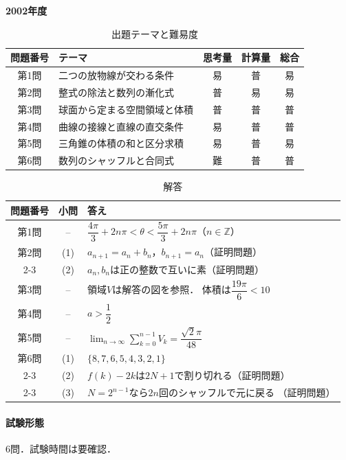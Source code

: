 \documentclass[../../main.tex]{subfiles}
\begin{document}
\begin{center}
  {\fontsize{48pt}{58pt}\selectfont \textbf{2002}\normalsize\textbf{年度}}
\end{center}

\begin{table}[htb]
  \centering
  \caption{出題テーマと難易度}
  \begin{tabular}{|c|p{6.2cm}|c|c|c|}
    \hline
    \textbf{問題番号} & \textbf{テーマ} & \textbf{思考量} & \textbf{計算量} & \textbf{総合} \\
    \hline
    第1問 & 二つの放物線が交わる条件 & 易 & 普 & 易 \\
    \hline
    第2問 & 整式の除法と数列の漸化式 & 普 & 易 & 易 \\
    \hline
    第3問 & 球面から定まる空間領域と体積 & 普 & 普 & 普 \\
    \hline
    第4問 & 曲線の接線と直線の直交条件 & 易 & 普 & 普 \\
    \hline
    第5問 & 三角錐の体積の和と区分求積 & 易 & 普 & 易 \\
    \hline
    第6問 & 数列のシャッフルと合同式 & 難 & 普 & 普 \\
    \hline
  \end{tabular}
\end{table}

\begin{table}[htb]
  \centering
  \caption{解答}
  \renewcommand{\arraystretch}{1.4}
  \begin{tabular}{|c|c|p{9cm}|}
    \hline
    \textbf{問題番号} & \textbf{小問} & \textbf{答え} \\
    \hline
    第1問 & -- & $\dfrac{4\pi}{3}+2n\pi<\theta<
    \dfrac{5\pi}{3}+2n\pi$（$n\in\mathbb{Z}$） \\
    \hline
    第2問 & (1) & $a_{n+1}=a_n+b_n$，$b_{n+1}=a_n$（証明問題） \\
    \cline{2-3}
    & (2) & $a_n,b_n$は正の整数で互いに素（証明問題） \\
    \hline
    第3問 & -- & 領域$V$は解答の図を参照．
    体積は$\dfrac{19\pi}{6}<10$ \\
    \hline
    第4問 & -- & $a>\dfrac{1}{2}$ \\
    \hline
    第5問 & -- & $\displaystyle\lim_{n\to\infty}
    \sum_{k=0}^{n-1}V_k=\dfrac{\sqrt{2}\pi}{48}$ \\
    \hline
    第6問 & (1) & $\{8,7,6,5,4,3,2,1\}$ \\
    \cline{2-3}
    & (2) & $f(k)-2k$は$2N+1$で割り切れる（証明問題） \\
    \cline{2-3}
    & (3) & $N=2^{n-1}$なら$2n$回のシャッフルで元に戻る
    （証明問題） \\
    \hline
  \end{tabular}
\end{table}

\paragraph{試験形態}
6問．試験時間は要確認．
\end{document}
